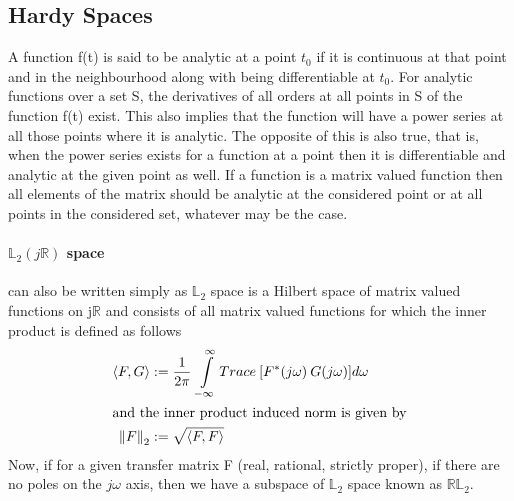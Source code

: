 \documentclass[a4paper,12pt]{article}
\newcommand\norm[1]{\left\lVert#1\right\rVert}
\begin{document}
	
	\subsection{Hardy Spaces}
		A function f(t) is said to be analytic at a point $t_{0}$ if it is continuous at that point and in the neighbourhood along with being differentiable at $t_{0}$. For analytic functions over a set S, the derivatives of all orders at all points in S of the function f(t) exist. This also implies that the function will have a power series at all those points where it is analytic. The opposite of this is also true, that is, when the power series exists for a function at a point then it is differentiable and analytic at the given point as well. If a function is a matrix valued function then all elements of the matrix should be analytic at the considered point or at all points in the considered set, whatever may be the case. \\
		\paragraph{$\mathbb{L}_{2}(j\mathbb{R})$ space} can also be written simply as $\mathbb{L}_{2}$ space is a Hilbert space of matrix valued functions on j$\mathbb{R}$ and consists of all matrix valued functions for which the inner product is defined as follows
		\begin{align}
			 \left\langle F, G \right\rangle &:= \frac{1}{2\pi} \: \int\limits_{-\infty}^\infty Trace \: [F^{*}(j\omega)\:G(j\omega)]d\omega \label{inner}\\
			 \intertext{and the inner product induced norm is given by}
			 \norm{F}_{2} &:= \sqrt{\left\langle F, F \right\rangle}
		\end{align}
		Now, if for a given transfer matrix F (real, rational, strictly proper), if there are no poles on the $j\omega$ axis, then we have a subspace of $\mathbb{L}_{2}$ space known as $\mathbb{RL}_{2}$.
		 
\end{document}
